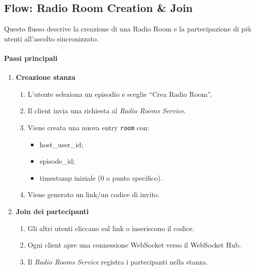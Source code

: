 \documentclass[11pt,a4paper]{article}
\begin{document}

\subsection{Flow: Radio Room Creation \& Join}

Questo flusso descrive la creazione di una Radio Room e la partecipazione di più utenti all'ascolto sincronizzato.

\paragraph{Passi principali}

\begin{enumerate}
    \item \textbf{Creazione stanza}
    \begin{enumerate}
        \item L'utente seleziona un episodio e sceglie ``Crea Radio Room''.
        \item Il client invia una richiesta al \textit{Radio Rooms Service}.
        \item Viene creata una nuova entry \texttt{room} con:
        \begin{itemize}
            \item host\_user\_id;
            \item episode\_id;
            \item timestamp iniziale (0 o punto specifico).
        \end{itemize}
        \item Viene generato un link/un codice di invito.
    \end{enumerate}

    \item \textbf{Join dei partecipanti}
    \begin{enumerate}
        \item Gli altri utenti cliccano sul link o inseriscono il codice.
        \item Ogni client apre una connessione WebSocket verso il WebSocket Hub.
        \item Il \textit{Radio Rooms Service} registra i partecipanti nella stanza.
    \end{enumerate}


\end{enumerate}
\end{document}
